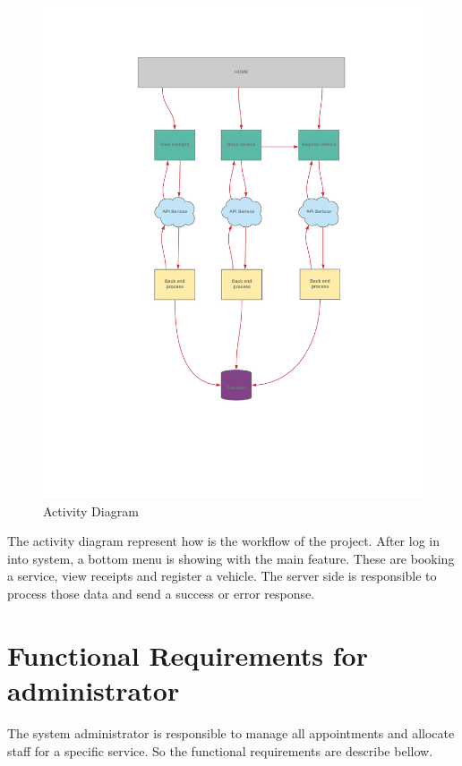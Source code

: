 \begin{figure}[h]
    \centering
    \includegraphics[width=\textwidth]{client_activity_diagram.png}
    \caption{Activity Diagram}
    \label{fig:mesh2}
\end{figure}

The activity diagram represent how is the workflow of the project. After log in into system, a bottom menu is showing with the main feature. These are booking a service, view receipts and register a vehicle. The server side is responsible to process those data and send a success or error response.

\section{Functional Requirements for administrator}

The system administrator is responsible to manage all appointments and allocate staff for a specific service. So the functional requirements are describe bellow.

